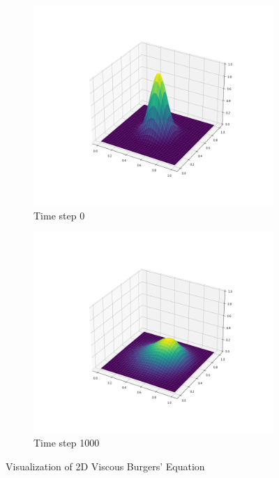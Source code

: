 \documentclass{article}
\begin{document}
\begin{figure}
\begin{subfigure}{.5\textwidth}
  \centering
  \includegraphics[width=1.0\linewidth]{Images/2D_Viscous_Burgers_Graph_0.png}
  \caption{Time step 0}
  \label{fig:sfig1}
\end{subfigure}%
\begin{subfigure}{.5\textwidth}
  \centering
  \includegraphics[width=1.0\linewidth]{Images/2D_Viscous_Burgers_Graph_999.png}
  \caption{Time step 1000}
  \label{fig:sfig2}
\end{subfigure}
\caption{Visualization of 2D Viscous Burgers' Equation}
\label{fig:fig}
\end{figure}
\end{document}
